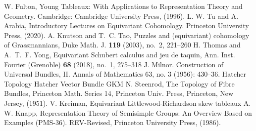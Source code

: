 \begin{thebibliography}{99}
  
   W. Fulton, Young Tableaux: With Applications to Representation Theory and Geometry. Cambridge: Cambridge University Press, (1996).
   L. W. Tu and A. Arabia, Introductory Lectures on Equivariant Cohomology. Princeton University Press, (2020).
   A. Knutson and T.~C. Tao, Puzzles and (equivariant) cohomology of Grassmannians, Duke Math. J. {\bf 119} (2003), no.~2, 221--260 
   H. Thomas and A.~T.~F. Yong, Equivariant Schubert calculus and jeu de taquin, Ann. Inst. Fourier (Grenoble) {\bf 68} (2018), no.~1, 275--318
   J. Milnor. Construction of Universal Bundles, II. Annals of Mathematics 63, no. 3 (1956): 430–36.
   Hatcher Topology
   Hatcher Vector Bundle
   GKM
   N. Steenrod, The Topology of Fibre Bundles, Princeton Math. Series 14,
  Princeton Univ. Press, Princeton, New Jersey, (1951).
   V. Kreiman, Equivariant Littlewood-Richardson skew tableaux
   A. W. Knapp, Representation Theory of Semisimple Groups: An Overview Based on Examples (PMS-36). REV-Revised, Princeton University Press, (1986). 

\end{thebibliography}